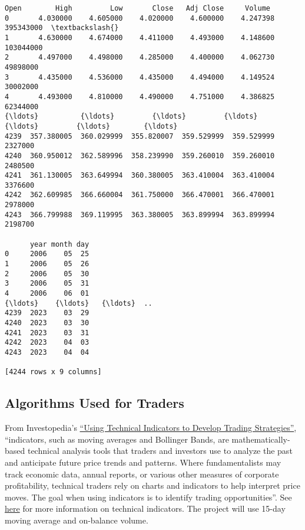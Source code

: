\documentclass[11pt]{article}
\makeatletter
\newcommand{\boxspacing}{\kern\kvtcb@left@rule\kern\kvtcb@boxsep}
\newcommand{\prompt}[4]{
        {\ttfamily\llap{{\color{#2}[#3]:\hspace{3pt}#4}}\vspace{-\baselineskip}}
    }
\makeatother
\begin{document}
            \begin{tcolorbox}[breakable, size=fbox, boxrule=.5pt, pad at break*=1mm, opacityfill=0]
\prompt{Out}{outcolor}{8}{\boxspacing}
\begin{Verbatim}[commandchars=\\\{\}]
            Open        High         Low       Close   Adj Close     Volume
0       4.030000    4.605000    4.020000    4.600000    4.247398  395343000  \textbackslash{}
1       4.630000    4.674000    4.411000    4.493000    4.148600  103044000
2       4.497000    4.498000    4.285000    4.400000    4.062730   49898000
3       4.435000    4.536000    4.435000    4.494000    4.149524   30002000
4       4.493000    4.810000    4.490000    4.751000    4.386825   62344000
{\ldots}          {\ldots}         {\ldots}         {\ldots}         {\ldots}         {\ldots}        {\ldots}
4239  357.380005  360.029999  355.820007  359.529999  359.529999    2327000
4240  360.950012  362.589996  358.239990  359.260010  359.260010    2480500
4241  361.130005  363.649994  360.380005  363.410004  363.410004    3376600
4242  362.609985  366.660004  361.750000  366.470001  366.470001    2978000
4243  366.799988  369.119995  363.380005  363.899994  363.899994    2198700

      year month day
0     2006    05  25
1     2006    05  26
2     2006    05  30
3     2006    05  31
4     2006    06  01
{\ldots}    {\ldots}   {\ldots}  ..
4239  2023    03  29
4240  2023    03  30
4241  2023    03  31
4242  2023    04  03
4243  2023    04  04

[4244 rows x 9 columns]
\end{Verbatim}
\end{tcolorbox}
        
    \hypertarget{algorithms-used-for-traders}{%
\subsection{Algorithms Used for
Traders}\label{algorithms-used-for-traders}}

From Investopedia's
\href{https://www.investopedia.com/articles/trading/11/indicators-and-strategies-explained.asp}{``Using
Technical Indicators to Develop Trading Strategies''}, ``indicators,
such as moving averages and Bollinger Bands, are mathematically-based
technical analysis tools that traders and investors use to analyze the
past and anticipate future price trends and patterns. Where
fundamentalists may track economic data, annual reports, or various
other measures of corporate profitability, technical traders rely on
charts and indicators to help interpret price moves. The goal when using
indicators is to identify trading opportunities''. See
\href{https://www.investopedia.com/terms/t/technicalindicator.asp}{here}
for more information on technical indicators. The project will use
15-day moving average and on-balance volume.
\end{document}
